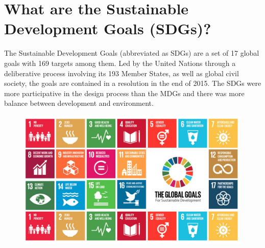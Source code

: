 \clearpage

\section{What are the Sustainable Development Goals (SDGs)?}
The Sustainable Development Goals (abbreviated as SDGs) are a set of 17 global goals with 169 targets among them. Led by the United Nations through a deliberative process involving its 193 Member States, as well as global civil society, the goals are contained in a resolution in the end of 2015. The SDGs were more participative in the design process than the MDGs and there was more balance between development and environment. 

\begin{figure}[ht]
\begin{center}
\includegraphics[scale=0.75]{SDG}
\end{center}
\end{figure}

